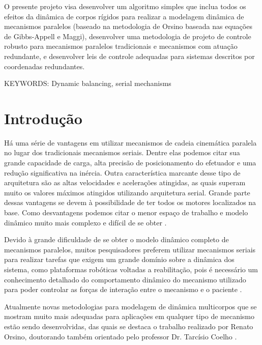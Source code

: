 \documentclass[a4paper,11pt,brazil,fleqn]{article}
\begin{document}
O presente projeto visa desenvolver um algoritmo simples que inclua todos os efeitos da din\^amica de corpos r\'igidos para realizar a modelagem din\^amica de mecanismos paralelos (baseado na metodologia de Orsino baseada nas equa\c{c}\~oes de Gibbs-Appell e Maggi), desenvolver uma metodologia de projeto de controle robusto para mecanismos paralelos tradicionais e mecanismos com atua\c{c}\~ao redundante, e desenvolver leis de controle adequadas para sistemas descritos por coordenadas redundantes.

\vspace{10pt}

\noindent
KEYWORDS: {Dynamic balancing, serial mechanisms}






\newpage
\section{Introdu\c{c}\~ao}\label{S01}

H\'a uma s\'erie de vantagens em utilizar mecanismos de cadeia cinem\'atica paralela no lugar dos tradicionais mecanismos seriais. Dentre elas podemos citar sua grande capacidade de carga, alta precis\~ao de posicionamento do efetuador e uma redu\c{c}\~ao significativa na in\'ercia. Outra caracter\'istica marcante desse tipo de arquitetura s\~ao as altas velocidades e acelera\c{c}\~oes atingidas, as quais superam muito os valores m\'aximos atingidos utilizando arquitetura serial. Grande parte dessas vantagens se devem à possibilidade de ter todos os motores localizados na base. Como desvantagens podemos citar o menor espa\c{c}o de trabalho e modelo din\^amico muito mais complexo e dif\'icil de se obter \cite{Merlet2002, Rynaldo}. 

	Devido à grande dificuldade de se obter o modelo din\^amico completo de mecanismos paralelos, muitos pesquisadores preferem utilizar mecanismos seriais para realizar tarefas que exigem um grande dom\'inio sobre a din\^amica dos sistema, como plataformas rob\'oticas voltadas a reabilita\c{c}\~ao, pois \'e necess\'ario um conhecimento detalhado do comportamento din\^amico do mecanismo utilizado para poder controlar as for\c{c}as de intera\c{c}\~ao entre o mecanismo e o paciente \cite{Andre, Andre2}.
	
	Atualmente novas metodologias para modelagem de din\^amica multicorpos que se mostram muito mais adequadas para aplica\c{c}\~oes em qualquer tipo de mecanismo est\~ao sendo desenvolvidas, das quais se destaca o trabalho realizado por Renato Orsino, doutorando tamb\'em orientado pelo professor Dr. Tarc\'isio Coelho \cite{Orsino2013, Apostila}.
	
\end{document}

